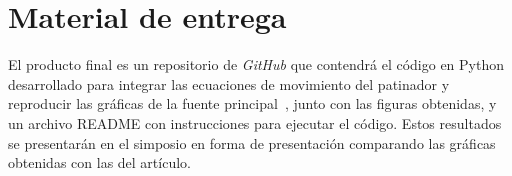\documentclass[12pt]{article}
\begin{document}
\section{Material de entrega}
	


El producto final es un repositorio de \textit{GitHub} que contendrá el código en
Python desarrollado para integrar las ecuaciones de movimiento del patinador y
reproducir las gráficas de la fuente principal~\cite{gzenda2020}, junto con las
figuras obtenidas, y un archivo README con
instrucciones para ejecutar el código. Estos resultados se presentarán en el
simposio en forma de presentación comparando las gráficas obtenidas con las del artículo.
	
	
	
	
	
	
	
	
	
	
	
	
	
	
	
\end{document}
